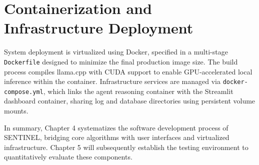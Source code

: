\section{Containerization and Infrastructure Deployment}
System deployment is virtualized using Docker, specified in a multi-stage \texttt{Dockerfile} designed to minimize the final production image size. The build process compiles llama.cpp with CUDA support to enable GPU-accelerated local inference within the container. Infrastructure services are managed via \texttt{docker-compose.yml}, which links the agent reasoning container with the Streamlit dashboard container, sharing log and database directories using persistent volume mounts.

In summary, Chapter 4 systematizes the software development process of SENTINEL, bridging core algorithms with user interfaces and virtualized infrastructure. Chapter 5 will subsequently establish the testing environment to quantitatively evaluate these components.
